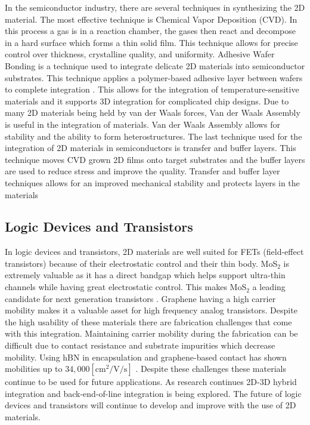 \documentclass[conference]{IEEEtran}
\begin{document}
In the semiconductor industry, there are several techniques in synthesizing the 2D material. The most effective technique is Chemical Vapor Deposition (CVD). In this process a gas is in a reaction chamber, the gases then react and decompose in a hard surface which forms a thin solid film. This technique allows for precise control over thickness, crystalline quality, and uniformity. Adhesive Wafer Bonding is a technique used to integrate delicate 2D materials into semiconductor substrates. This technique applies a polymer-based adhesive layer between wafers to complete integration \cite{ds1}. This allows for the integration of temperature-sensitive materials and it supports 3D integration for complicated chip designs. Due to many 2D materials being held by van der Waals forces, Van der Waals Assembly is useful in the integration of materials. Van der Waals Assembly allows for stability and the ability to form heterostructures. The last technique used for the integration of 2D materials in semiconductors is transfer and buffer layers. This technique moves CVD grown 2D films onto target substrates and the buffer layers are used to reduce stress and improve the quality. Transfer and buffer layer techniques allows for an improved mechanical stability and protects layers in the materials

\subsection{Logic Devices and Transistors}

In logic devices and transistors, 2D materials are well suited for FETs (field-effect transistors) because of their electrostatic control and their thin body. MoS$_2$ is extremely valuable as it has a direct bandgap which helps support ultra-thin channels while having great electrostatic control. This makes MoS$_2$ a leading candidate for next generation transistors \cite{ds2}. Graphene having a high carrier mobility makes it a valuable asset for high frequency analog transistors. Despite the high usability of these materials there are fabrication challenges that come with this integration. Maintaining carrier mobility during the fabrication can be difficult due to contact resistance and substrate impurities which decrease mobility. Using hBN in encapsulation and graphene-based contact has shown mobilities up to $34,000[\si{\centi\meter\squared\per\volt\per\second}]$ \cite{ds3}. Despite these challenges these materials continue to be used for future applications. As research continues 2D-3D hybrid integration and back-end-of-line integration is being explored. The future of logic devices and transistors will continue to develop and improve with the use of 2D materials.
\end{document}
